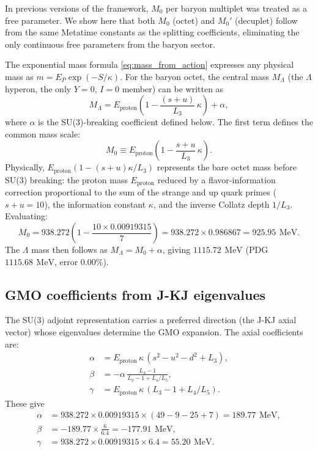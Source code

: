 \documentclass[aps,prd,reprint,twocolumn,showpacs,superscriptaddress]{revtex4-2}
\newcommand{\mev}{\,\text{MeV}}
\begin{document}
In previous versions of the framework, $M_0$ per baryon multiplet was
treated as a free parameter.  We show here that both $M_0$ (octet) and
$M_0'$ (decuplet) follow from the same Metatime constants as the
splitting coefficients, eliminating the only continuous free parameters
from the baryon sector.

The exponential mass formula \eqref{eq:mass_from_action} expresses any
physical mass as $m = E_P\exp(-S/\kappa)$.  For the baryon octet, the
central mass $M_\Lambda$ (the $\Lambda$ hyperon, the only $Y=0,\,I=0$
member) can be written as
\begin{equation}
M_\Lambda = E_{\text{proton}}\left(1 - \frac{(s+u)}{L_3}\,\kappa\right) + \alpha,
\label{eq:M0_derivation}
\end{equation}
where $\alpha$ is the SU(3)-breaking coefficient defined below.
The first term defines the common mass scale:
\begin{equation}
M_0 \equiv E_{\text{proton}}\left(1 - \frac{s+u}{L_3}\,\kappa\right).
\label{eq:M0}
\end{equation}
Physically, $E_{\text{proton}}(1 - (s+u)\kappa/L_3)$ represents the
bare octet mass before SU(3) breaking: the proton mass $E_{\text{proton}}$
reduced by a flavor-information correction proportional to the sum of the
strange and up quark primes ($s+u=10$), the information constant $\kappa$,
and the inverse Collatz depth $1/L_3$.  Evaluating:
\begin{equation}
M_0 = 938.272\left(1 - \frac{10\times 0.00919315}{7}\right)
    = 938.272 \times 0.986867
    = 925.95\ \mev.
\label{eq:M0_value}
\end{equation}
The $\Lambda$ mass then follows as $M_\Lambda = M_0 + \alpha$, giving
$1115.72\ \mev$ (PDG $1115.68\ \mev$, error $0.00\%$).

\subsection{GMO coefficients from J-KJ eigenvalues}

The SU(3) adjoint representation carries a preferred direction
(the J-KJ axial vector) whose eigenvalues determine the GMO expansion.
The axial coefficients are:
\begin{align}
\alpha &= E_{\text{proton}}\,\kappa\,(s^2 - u^2 - d^2 + L_3), \label{eq:alpha} \\
\beta &= -\alpha\,\frac{L_3 - 1}{L_3 - 1 + L_4/L_5}, \label{eq:beta} \\
\gamma &= E_{\text{proton}}\,\kappa\,(L_3 - 1 + L_4/L_5). \label{eq:gamma}
\end{align}
These give
\begin{align}
\alpha &= 938.272 \times 0.00919315 \times (49 - 9 - 25 + 7)
       = 189.77\ \mev, \\
\beta &= -189.77 \times \frac{6}{6.4}
       = -177.91\ \mev, \\
\gamma &= 938.272 \times 0.00919315 \times 6.4
       = 55.20\ \mev.
\end{align}
\end{document}
